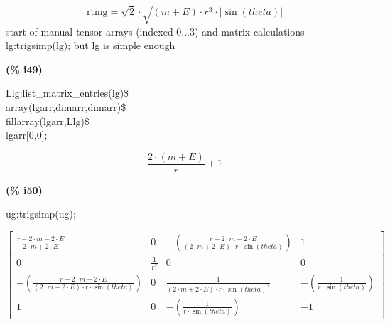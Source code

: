 \documentclass[fleqn]{article}
\begin{document}
\[\tag{\% t45} 
\ensuremath{\mathrm{rtmg}}\mathop{=}\sqrt{2}\mathop{\ensuremath{\cdot}}\sqrt{\left( m\mathop{+}E\right) \mathop{\ensuremath{\cdot}}{{r}^{3}}}\mathop{\ensuremath{\cdot}}\left| \sin{(theta)}\right| \mbox{}
\]
start of manual tensor arrays (indexed 0...3) and matrix calculations
lg:trigsimp(lg); but lg is simple enough


\noindent
\begin{minipage}[t]{4.000000em}\color{red}\bfseries
(\% i49)	
\end{minipage}
\begin{minipage}[t]{\textwidth}\color{blue}
Llg:list\_matrix\_entries(lg)\$\\
array(lgarr,dimarr,dimarr)\$\\
fillarray(lgarr,Llg)\$\\
lgarr[0,0];
\end{minipage}
\[\displaystyle \tag{\% o49} 
\frac{2\mathop{\ensuremath{\cdot}}\left( m\mathop{+}E\right) }{r}\mathop{+}1\mbox{}
\]


\noindent
\begin{minipage}[t]{4.000000em}\color{red}\bfseries
(\% i50)	
\end{minipage}
\begin{minipage}[t]{\textwidth}\color{blue}
ug:trigsimp(ug);
\end{minipage}
\[\displaystyle \tag{\% o50} 
\begin{bmatrix}\frac{r\mathop{-}2\mathop{\ensuremath{\cdot}}m\mathop{-}2\mathop{\ensuremath{\cdot}}E}{2\mathop{\ensuremath{\cdot}}m\mathop{+}2\mathop{\ensuremath{\cdot}}E} & 0 & \mathop{-}\left( \frac{r\mathop{-}2\mathop{\ensuremath{\cdot}}m\mathop{-}2\mathop{\ensuremath{\cdot}}E}{\left( 2\mathop{\ensuremath{\cdot}}m\mathop{+}2\mathop{\ensuremath{\cdot}}E\right) \mathop{\ensuremath{\cdot}}r\mathop{\ensuremath{\cdot}}\sin{(theta)}}\right)  & 1\\
0 & \frac{1}{{{r}^{2}}} & 0 & 0\\
\mathop{-}\left( \frac{r\mathop{-}2\mathop{\ensuremath{\cdot}}m\mathop{-}2\mathop{\ensuremath{\cdot}}E}{\left( 2\mathop{\ensuremath{\cdot}}m\mathop{+}2\mathop{\ensuremath{\cdot}}E\right) \mathop{\ensuremath{\cdot}}r\mathop{\ensuremath{\cdot}}\sin{(theta)}}\right)  & 0 & \frac{1}{\left( 2\mathop{\ensuremath{\cdot}}m\mathop{+}2\mathop{\ensuremath{\cdot}}E\right) \mathop{\ensuremath{\cdot}}r\mathop{\ensuremath{\cdot}}{{\sin{(theta)}}^{2}}} & \mathop{-}\left( \frac{1}{r\mathop{\ensuremath{\cdot}}\sin{(theta)}}\right) \\
1 & 0 & \mathop{-}\left( \frac{1}{r\mathop{\ensuremath{\cdot}}\sin{(theta)}}\right)  & \mathop{-}1\end{bmatrix}\mbox{}
\]
\end{document}

